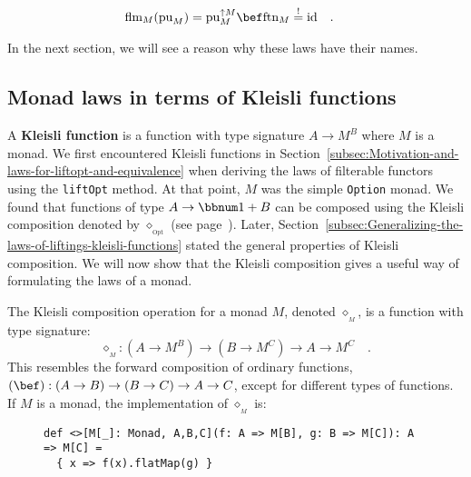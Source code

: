 ~\vspace{-0.6\baselineskip}
\begin{align}
 & \text{flm}_{M}(\text{pu}_{M})=\text{pu}_{M}^{\uparrow M}\bef\text{ftn}_{M}\overset{!}{=}\text{id}\quad.\label{eq:right-identity-law-for-flatten}
\end{align}
\vspace{-0.1\baselineskip}

In the next section, we will see a reason why these laws have their
names.

\subsection{Monad laws in terms of Kleisli functions}

A \textbf{Kleisli function} is a
function with type signature $A\rightarrow M^{B}$ where $M$ is a
monad. We first encountered Kleisli functions in Section~\ref{subsec:Motivation-and-laws-for-liftopt-and-equivalence}
when deriving the laws of filterable functors using the \lstinline!liftOpt!
method. At that point, $M$ was the simple \lstinline!Option! monad.
We found that functions of type $A\rightarrow\bbnum 1+B$ can be composed
using the Kleisli composition denoted by $\diamond_{_{\text{Opt}}}$
(see page~\pageref{kleisli-composition}). Later, Section~\ref{subsec:Generalizing-the-laws-of-liftings-kleisli-functions}
stated the general properties of Kleisli composition. We will now
show that the Kleisli composition gives a useful way of formulating
the laws of a monad.

The Kleisli composition operation for
a monad $M$, denoted $\diamond_{_{M}}$, is a function with type
signature:
\[
\diamond_{_{M}}:(A\rightarrow M^{B})\rightarrow(B\rightarrow M^{C})\rightarrow A\rightarrow M^{C}\quad.
\]
This resembles the forward composition of ordinary functions, $\left(\bef\right):\left(A\rightarrow B\right)\rightarrow\left(B\rightarrow C\right)\rightarrow A\rightarrow C$,
except for different types of functions. If $M$ is a monad, the implementation
of $\diamond_{_{M}}$ is:

\begin{wrapfigure}{l}{0.67\columnwidth}%
\vspace{-0.8\baselineskip}
\begin{lstlisting}
def <>[M[_]: Monad, A,B,C](f: A => M[B], g: B => M[C]): A => M[C] =
  { x => f(x).flatMap(g) }
\end{lstlisting}
\vspace{-0.9\baselineskip}
\end{wrapfigure}%

